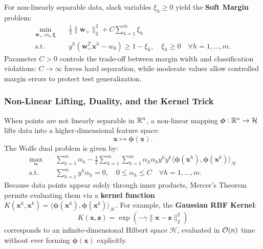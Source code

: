 For non-linearly separable data, slack variables $\xi_h \ge 0$ yield the \textbf{Soft Margin} problem:
\begin{equation}
\begin{aligned}
    \min_{\mathbf{w}_+, w_0, \boldsymbol{\xi}} \quad & \frac{1}{2} \|\mathbf{w}_+\|_2^2 + C \sum_{h=1}^m \xi_h \\
    \text{s.t.} \quad & y^h (\mathbf{w}_+^T \mathbf{x}^h - w_0) \ge 1 - \xi_h, \quad \xi_h \ge 0 \quad \forall h=1, \dots, m.
\end{aligned}
\end{equation}
Parameter $C > 0$ controls the trade-off between margin width and classification violations: $C \to \infty$ forces hard separation, while moderate values allow controlled margin errors to protect test generalization.

\subsubsection{Non-Linear Lifting, Duality, and the Kernel Trick}
When points are not linearly separable in $\mathbb{R}^n$, a non-linear mapping $\boldsymbol{\phi}: \mathbb{R}^n \to \mathcal{H}$ lifts data into a higher-dimensional feature space:
\begin{equation}
    \mathbf{x} \mapsto \boldsymbol{\phi}(\mathbf{x}).
\end{equation}
The Wolfe dual problem is given by:
\begin{equation}
\begin{aligned}
    \max_{\boldsymbol{\alpha}} \quad & \sum_{h=1}^m \alpha_h - \frac{1}{2} \sum_{h=1}^m \sum_{k=1}^m \alpha_h \alpha_k y^h y^k \langle \boldsymbol{\phi}(\mathbf{x}^h), \boldsymbol{\phi}(\mathbf{x}^k) \rangle_{\mathcal{H}} \\
    \text{s.t.} \quad & \sum_{h=1}^m y^h \alpha_h = 0, \quad 0 \le \alpha_h \le C \quad \forall h=1, \dots, m.
\end{aligned}
\end{equation}
Because data points appear solely through inner products, Mercer's Theorem permits evaluating them via a \textbf{kernel function} $K(\mathbf{x}^h, \mathbf{x}^k) = \langle \boldsymbol{\phi}(\mathbf{x}^h), \boldsymbol{\phi}(\mathbf{x}^k) \rangle_{\mathcal{H}}$. For example, the \textbf{Gaussian RBF Kernel}:
\begin{equation}
    K(\mathbf{x}, \mathbf{z}) = \exp\left(-\gamma \|\mathbf{x} - \mathbf{z}\|_2^2\right)
\end{equation}
corresponds to an infinite-dimensional Hilbert space $\mathcal{H}$, evaluated in $\mathcal{O}\!\left(n\right)$ time without ever forming $\boldsymbol{\phi}(\mathbf{x})$ explicitly.

